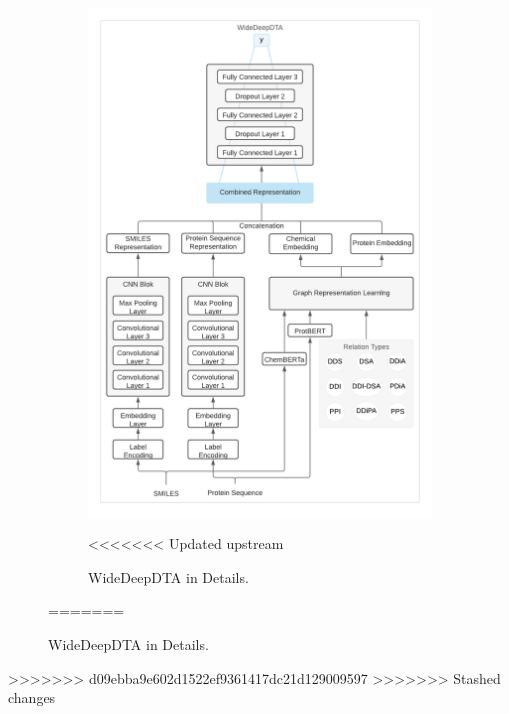 \begin{figure}[h]
\begin{figure}
    \centering
        \includegraphics[width=\linewidth]{chapters/materials_and_methods/figures/WiderDeepDTA Model.png}
    \caption{WideDeepDTA in Details.}
    \label{fig:widedeepdtamodel}
<<<<<<< Updated upstream
\end{figure}
=======
\end{figure}
>>>>>>> d09ebba9e602d1522ef9361417dc21d129009597
>>>>>>> Stashed changes
